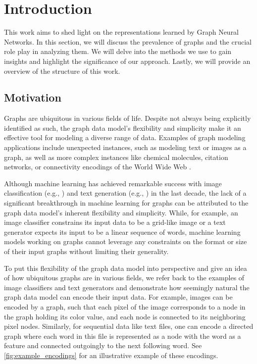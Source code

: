 \cleardoubleoddstandardpage
\chapter{Introduction}
This work aims to shed light on the representations learned by \textsf{Graph Neural Networks}. In this section, we will discuss the prevalence of graphs and the crucial role \gnns play in analyzing them. We will delve into the methods we use to gain insights and highlight the significance of our approach. Lastly, we will provide an overview of the structure of this work.

\section{Motivation}
Graphs are ubiquitous in various fields of life. Despite not always being explicitly identified as such, the graph data model's flexibility and simplicity make it an effective tool for modeling a diverse range of data. Examples of graph modeling applications include unexpected instances, such as modeling text or images as a graph, as well as more complex instances like chemical molecules, citation networks, or connectivity encodings of the World Wide Web \cite{Mor+2020, Sca+2009}.

Although machine learning has achieved remarkable success with image classification (e.g., \cite{Zoph2018, He2016}) and text generation (e.g., \cite{Radford2019, Brown2020}) in the last decade, the lack of a significant breakthrough in machine learning for graphs can be attributed to the graph data model's inherent flexibility and simplicity. While, for example, an image classifier constrains its input data to be a grid-like image or a text generator expects its input to be a linear sequence of words, machine learning models working on graphs cannot leverage any constraints on the format or size of their input graphs without limiting their generality. 

To put this flexibility of the graph data model into perspective and give an idea of how ubiquitous graphs are in various fields, we refer back to the examples of image classifiers and text generators and demonstrate how seemingly natural the graph data model can encode their input data. For example, images can be encoded by a graph, such that each pixel of the image corresponds to a node in the graph holding its color value, and each node is connected to its neighboring pixel nodes. Similarly, for sequential data like text files, one can encode a directed graph where each word in this file is represented as a node with the word as a feature and connected outgoingly to the next following word. See \cref{fig:example_encodings} for an illustrative example of these encodings.


